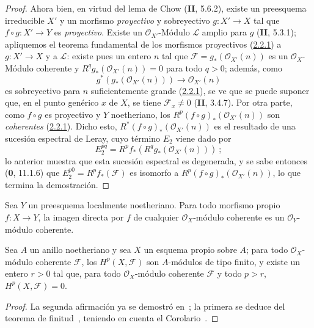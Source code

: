 \begin{proof}
Ahora bien, en virtud del lema de Chow (\textbf{II}, 5.6.2), existe un preesquema
irreducible $X'$ y un morfismo \emph{proyectivo} y sobreyectivo
$g:X'\to X$ tal que $f\circ g:X'\to Y$ es \emph{proyectivo}. Existe un
$\mathcal O_{X'}$-Módulo $\mathcal L$ amplio para $g$ (\textbf{II}, 5.3.1);
apliquemos el teorema fundamental de los morfismos proyectivos
(\hyperref[III.2.2.1-fr]{2.2.1}) a $g:X'\to X$ y a $\mathcal L$:
existe pues un entero $n$ tal que
$\mathcal F=g_*(\mathcal O_{X'}(n))$ es un $\mathcal O_X$-Módulo coherente
y $R^qg_*(\mathcal O_{X'}(n))=0$ para todo $q>0$; además, como
\[
g^*(g_*(\mathcal O_{X'}(n)))\longrightarrow\mathcal O_{X'}(n)
\]
es sobreyectivo para $n$ suficientemente grande (\hyperref[III.2.2.1-fr]{2.2.1}), se
ve que se puede suponer que, en el punto genérico $x$ de $X$, se tiene
$\mathcal F_x\neq0$ (\textbf{II}, 3.4.7). Por otra parte, como $f\circ g$ es
proyectivo y $Y$ noetheriano, los
$R^p(f\circ g)_*(\mathcal O_{X'}(n))$ son \emph{coherentes}
(\hyperref[III.2.2.1-fr]{2.2.1}). Dicho esto,
$R^*(f\circ g)_*(\mathcal O_{X'}(n))$ es el resultado de una sucesión
espectral de Leray, cuyo término $E_2$ viene dado por
\[
E_2^{pq}=R^pf_*(R^qg_*(\mathcal O_{X'}(n)))~;
\]
lo anterior muestra que esta sucesión espectral es degenerada, y se sabe
entonces (\textbf{0}, 11.1.6) que $E_2^{p0}=R^pf_*(\mathcal F)$ es isomorfo a
$R^p(f\circ g)_*(\mathcal O_{X'}(n))$, lo que termina la demostración.
\end{proof}

\begin{corollary}[3.2.2]
\label{III.3.2.2}
\label{III.3.2.2-fr}
Sea $Y$ un preesquema localmente noetheriano.
Para todo morfismo propio $f:X\to Y$, la imagen directa por $f$ de cualquier $\mathcal O_X$-módulo coherente es un $\mathcal O_Y$-módulo coherente.
\end{corollary}

\begin{corollary}[3.2.3]
\label{III.3.2.3}
\label{III.3.2.3-fr}
Sea $A$ un anillo noetheriano y sea $X$ un esquema propio sobre $A$; para todo $\mathcal O_X$-módulo coherente $\mathcal F$, los $H^p(X,\mathcal F)$ son $A$-módulos de tipo finito, y existe un entero $r>0$ tal que, para todo $\mathcal O_X$-módulo coherente $\mathcal F$ y todo $p>r$, $H^p(X,\mathcal F)=0$.
\end{corollary}

\begin{proof}
La segunda afirmación ya se demostró en~; la primera se deduce del teorema de finitud~, teniendo en cuenta el Corolario~.
\end{proof}

